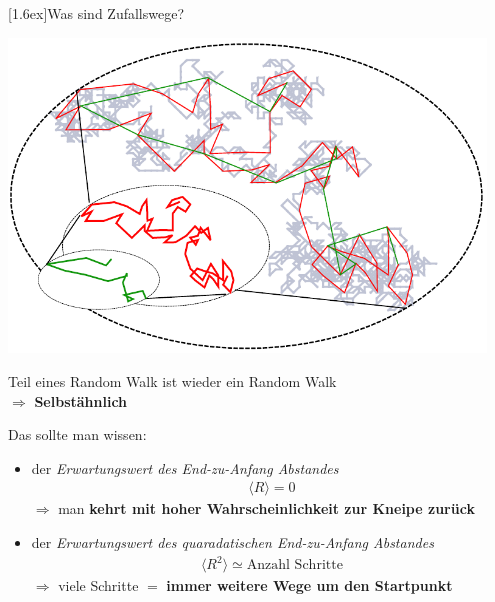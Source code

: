 \documentclass[final]{beamer}
\newlength{\columnheight}
\newlength{\marginw}
\newlength{\tw}
\newlength{\colsep}
\newlength{\colw}
\newenvironment{myTwoColPoster}{%
  \begin{minipage}[t]{\textwidth}%
    \hspace*{\marginw}%
    \hspace*{9.5bp}%
    \begin{minipage}[t]{\tw}}%
  {\end{minipage}%
   \hspace*{\marginw}%
   \end{minipage}}
\newenvironment{myCol}%
    {\begin{minipage}[t][\columnheight][t]{\colw}}%
    {\end{minipage}}
\newenvironment{textblock}[1]%
    {\begin{block}{\rule[-0.6ex]{0pt}{2.4ex}\raisebox{-0.25ex}[1.6ex]{#1}}%
     \vspace*{5mm}}%
    {\vspace*{5mm}\end{block}}
\begin{document}
\begin{frame}[t]{}
\begin{myTwoColPoster}
\begin{myCol}
\begin{textblock}{Was sind Zufallswege?}
\begin{center}
    \end{center}
    \begin{minipage}[c]{0.7\textwidth}
      \includegraphics[width=0.95\textwidth]{fig/randomWalkSelfsimiliar}
    \end{minipage}
    \begin{minipage}[c]{0.29\textwidth}
      Teil eines Random Walk ist wieder ein Random Walk\\
      \textcolor{IPForange}{$\Rightarrow$ \textbf{Selbstähnlich}}

    \end{minipage}
    Das sollte man wissen:
    \begin{itemize} \setlength\itemsep{1.1em} \Large
      \item der \textit{Erwartungswert des End-zu-Anfang Abstandes} 
      \begin{align*}
        \langle R \rangle=0
      \end{align*}
      $\Rightarrow$ man \textbf{kehrt mit hoher Wahrscheinlichkeit zur Kneipe zurück}
      \item der \textit{Erwartungswert des quaradatischen End-zu-Anfang Abstandes} 
      \begin{align*}
        \langle R^2 \rangle \simeq \text{Anzahl Schritte}
      \end{align*}$\Rightarrow$ viele Schritte $=$ \textbf{immer weitere Wege um den Startpunkt}
    \end{itemize}
  \end{textblock}

  

\end{myCol}
\hfill
\begin{myCol}
  

\end{myCol}
\end{myTwoColPoster}
\end{frame}
\end{document}
